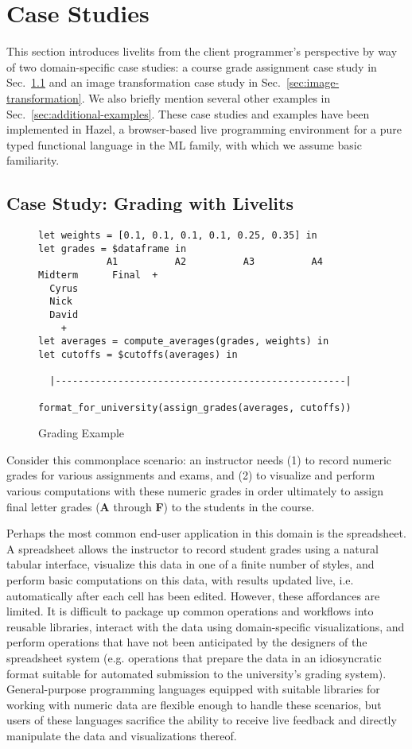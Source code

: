 \section{Case Studies}\label{sec:case-studies}
This section introduces livelits from the client programmer's perspective by way of 
two domain-specific case studies:
a course grade assignment case study in Sec.~\ref{sec:live-grading} 
and an image transformation case study in Sec.~\ref{sec:image-transformation}. 
We also briefly mention several other examples in Sec.~\ref{sec:additional-examples}. 
These case studies and examples have been implemented
in Hazel, a browser-based live programming environment for a pure typed functional language in the
ML family, with which we assume basic familiarity. 

\subsection{Case Study: Grading with Livelits}\label{sec:live-grading}
\begin{figure}
\begin{lstlisting}
let weights = [0.1, 0.1, 0.1, 0.1, 0.25, 0.35] in 
let grades = $dataframe in 
            A1          A2          A3          A4       Midterm      Final  +
  Cyrus
  Nick
  David
    + 
let averages = compute_averages(grades, weights) in 
let cutoffs = $cutoffs(averages) in 

  |---------------------------------------------------|

format_for_university(assign_grades(averages, cutoffs))
\end{lstlisting}
\caption{Grading Example}
\label{fig:grading}
\end{figure}

Consider this commonplace scenario: an instructor needs 
(1) to record numeric grades for various assignments and exams, and 
(2) to visualize and perform various computations with these numeric grades 
in order ultimately to assign final letter grades (\textbf{A} through \textbf{F}) to the students in the course.

Perhaps the most common end-user application in this domain is the spreadsheet.
A spreadsheet allows the instructor to record student grades using a natural tabular interface,
visualize this data in one of a finite number of styles, and perform basic computations on this data,
with results updated live, i.e. automatically after each cell has been edited. 
However, these affordances are limited. It is difficult to package up common operations and workflows 
into reusable libraries, interact with the data using domain-specific visualizations, 
and perform operations that have not been anticipated by the designers of the spreadsheet system 
(e.g. operations that prepare the data in an idiosyncratic format suitable for automated submission 
to the university's grading system). 
General-purpose programming languages equipped with suitable libraries for working with numeric data
are flexible enough to handle these scenarios, but users of these languages 
sacrifice the ability to receive live feedback and directly manipulate the data and visualizations thereof.


